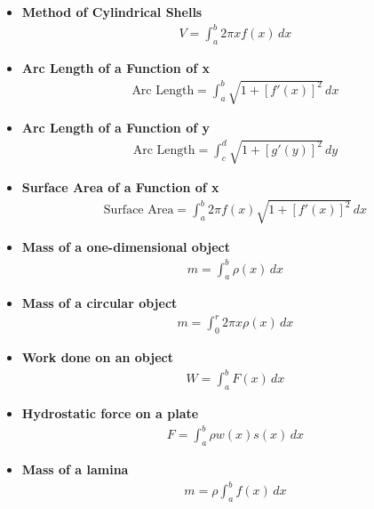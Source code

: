 \documentclass{report}
\begin{document}
\begin{itemize}
    \item \textbf{Method of Cylindrical Shells}
    \begin{align}
        V = \int_{a}^{b} 2\pi x f(x) \, dx
    \end{align}

    \item \textbf{Arc Length of a Function of x}
    \begin{align}
        \text{Arc Length} = \int_{a}^{b} \sqrt{1 + [f'(x)]^2} \, dx
    \end{align}

    \item \textbf{Arc Length of a Function of y}
    \begin{align}
        \text{Arc Length} = \int_{c}^{d} \sqrt{1 + [g'(y)]^2} \, dy
    \end{align}

    \item \textbf{Surface Area of a Function of x}
    \begin{align}
        \text{Surface Area} = \int_{a}^{b} 2\pi f(x) \sqrt{1 + [f'(x)]^2} \, dx
    \end{align}

    \item \textbf{Mass of a one-dimensional object}
    \begin{align}
        m = \int_{a}^{b} \rho(x) \, dx
    \end{align}

    \item \textbf{Mass of a circular object}
    \begin{align}
        m = \int_{0}^{r} 2\pi x \rho(x) \, dx
    \end{align}

    \item \textbf{Work done on an object}
    \begin{align}
        W = \int_{a}^{b} F(x) \, dx
    \end{align}

    \item \textbf{Hydrostatic force on a plate}
    \begin{align}
        F = \int_{a}^{b} \rho w(x) s(x) \, dx
    \end{align}

    \item \textbf{Mass of a lamina}
    \begin{align}
        m = \rho \int_{a}^{b} f(x) \, dx
    \end{align}


\end{itemize}
\end{document}
